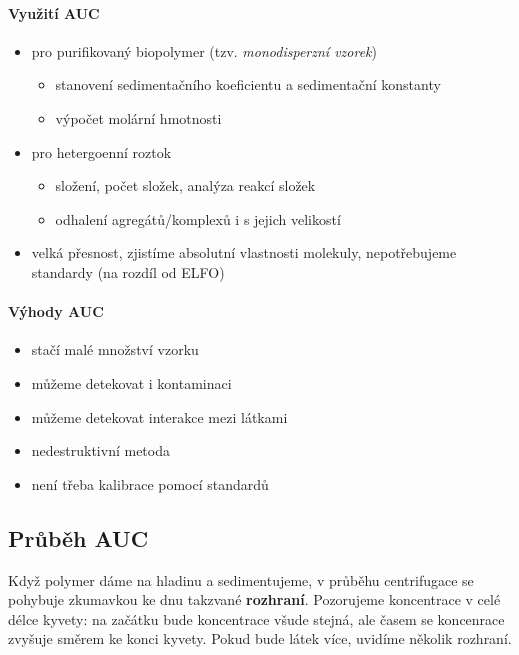 \documentclass[DIV=8]{scrreprt}
\begin{document}
\paragraph{Využití AUC}
\begin{itemize}[nosep]
    \item pro purifikovaný biopolymer (tzv. \emph{monodisperzní vzorek})
\begin{itemize}[nosep]
    \item stanovení sedimentačního koeficientu a sedimentační konstanty
    \item výpočet molární hmotnosti
\end{itemize}

    \item pro hetergoenní roztok
\begin{itemize}[nosep]
    \item složení, počet složek, analýza reakcí složek
    \item odhalení agregátů/komplexů i s jejich velikostí
\end{itemize}

    \item velká přesnost, zjistíme absolutní vlastnosti molekuly, nepotřebujeme standardy (na rozdíl od ELFO)
\end{itemize}



\paragraph{Výhody AUC}
\begin{itemize}[nosep]
    \item stačí malé množství vzorku
    \item můžeme detekovat i kontaminaci
    \item můžeme detekovat interakce mezi látkami
    \item nedestruktivní metoda
    \item není třeba kalibrace pomocí standardů
\end{itemize}



\subsection{Průběh AUC} \label{Průběh AUC}


Když polymer dáme na hladinu a sedimentujeme, v průběhu centrifugace se pohybuje zkumavkou ke dnu takzvané \textbf{rozhraní}. Pozorujeme koncentrace v celé délce kyvety: na začátku bude koncentrace všude stejná, ale časem se koncenrace zvyšuje směrem ke konci kyvety. Pokud bude látek více, uvidíme několik rozhraní.
\end{document}
